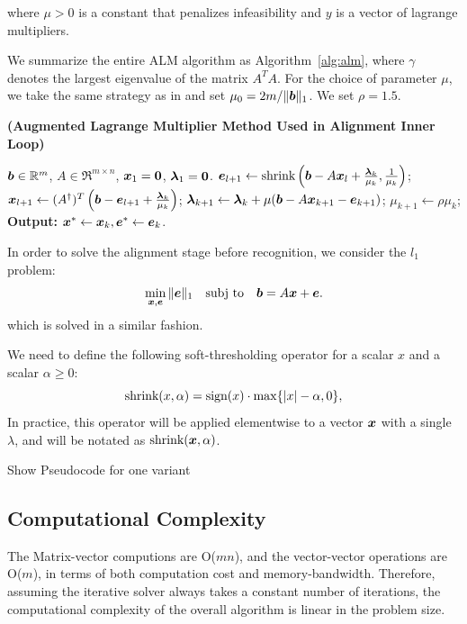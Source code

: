 \documentclass[10pt,twocolumn,letterpaper]{article}
\begin{document}
where $\mu > 0$ is a constant that penalizes infeasibility and $y$ is a vector of lagrange multipliers.

We summarize the entire ALM
algorithm as Algorithm~\ref{alg:alm}, where $\gamma$ denotes the
largest eigenvalue of the matrix $A^TA$. For the choice of parameter $\mu$, we take the same strategy as
in \cite{YangJ2009-pp} and set $\mu_0 = 2m / \|\boldsymbol{b}\|_1$. We set $\rho=1.5$.
\begin{algorithm}[h]
\caption{\bf (Augmented Lagrange Multiplier Method Used in Alignment Inner Loop)}
\begin{algorithmic}[1]
 $\boldsymbol{b} \in \mathbb R^m$, $A \in \Re^{m \times n}$,
${\boldsymbol{x}}_1 = \boldsymbol{0}$, $\boldsymbol{\lambda}_1 = \boldsymbol{0}$.
\STATE $\boldsymbol{e}_{l+1} \leftarrow \textup{shrink}\left(\boldsymbol{b} - A{\boldsymbol{x}}_l + \frac{\boldsymbol{\lambda}_k}{\mu_k}, \frac{1}{\mu_k}\right)$;
\STATE ${\boldsymbol{x}}_{l+1} \leftarrow (A^\dagger)^T \left(\boldsymbol{b} - \boldsymbol{e}_{l+1} + \frac{\boldsymbol{\lambda}_k}{\mu_k} \right) $;
\ENDWHILE
\STATE $\boldsymbol{\lambda}_{k+1} \leftarrow \boldsymbol{\lambda}_k + \mu (\boldsymbol{b} - A{\boldsymbol{x}}_{k+1} - \boldsymbol{e}_{k+1})$;
\STATE $\mu_{k+1} \leftarrow \rho\mu_k$;
\ENDWHILE \STATE
{\bf Output:} ${\boldsymbol{x}}^* \leftarrow {\boldsymbol{x}}_k, \boldsymbol{e}^* \leftarrow \boldsymbol{e}_k$.
\end{algorithmic}
\label{alg:alm}
\end{algorithm}

In order to solve the alignment stage before recognition, we consider the $l_1$ problem: 
\begin{equation}
\min_{{\boldsymbol{x}}, \boldsymbol{e}} \|\boldsymbol{e}\|_1 \quad \textup{subj to} \quad \boldsymbol{b} = A {\boldsymbol{x}} + \boldsymbol{e}.
\end{equation}
which is solved in a similar fashion.

We need to define the following soft-thresholding operator for a
scalar $x$ and a scalar $\alpha \geq 0$:
\begin{equation}
\textup{shrink}(x,\alpha) = \textup{sign}(x)\cdot \max \{|x| - \alpha, 0\},
\end{equation}
In practice, this operator will be applied elementwise to a vector ${\boldsymbol{x}}$ with a single $\lambda$,
and will be notated as $\textup{shrink}({\boldsymbol{x}},\alpha)$.

Show Pseudocode for one variant
\subsection{Computational Complexity}
The Matrix-vector computions are O($mn$), and the vector-vector operations are O($m$), 
in terms of both computation cost and memory-bandwidth.
Therefore, assuming the iterative solver always takes a constant number of iterations,
the computational complexity of the overall algorithm is linear in the problem size.
\end{document}
